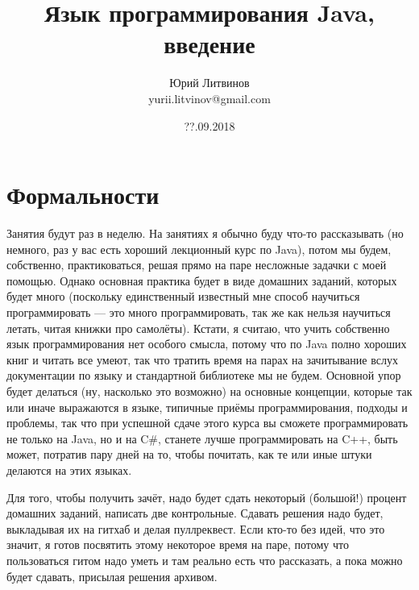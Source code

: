 \documentclass[a5paper]{article}
\title{Язык программирования Java, введение}
\author{Юрий Литвинов\\\small{yurii.litvinov@gmail.com}}
\date{??.09.2018}
\begin{document}
\maketitle
\thispagestyle{empty}

\section{Формальности}

Занятия будут раз в неделю. На занятиях я обычно буду что-то рассказывать (но немного, раз у вас есть хороший лекционный курс по Java), потом мы будем, собственно, практиковаться, решая прямо на паре несложные задачки с моей помощью. Однако основная практика будет в виде домашних заданий, которых будет много (поскольку единственный известный мне способ научиться программировать --- это много программировать, так же как нельзя научиться летать, читая книжки про самолёты). Кстати, я считаю, что учить собственно язык программирования нет особого смысла, потому что по Java полно хороших книг и читать все умеют, так что тратить время на парах на зачитывание вслух документации по языку и стандартной библиотеке мы не будем. Основной упор будет делаться (ну, насколько это возможно) на основные концепции, которые так или иначе выражаются в языке, типичные приёмы программирования, подходы и проблемы, так что при успешной сдаче этого курса вы сможете программировать не только на Java, но и на C\#, станете лучше программировать на C++, быть может, потратив пару дней на то, чтобы почитать, как те или иные штуки делаются на этих языках.

Для того, чтобы получить зачёт, надо будет сдать некоторый (большой!) процент домашних заданий, написать две контрольные. Сдавать решения надо будет, выкладывая их на гитхаб и делая пуллреквест. Если кто-то без идей, что это значит, я готов посвятить этому некоторое время на паре, потому что пользоваться гитом надо уметь и там реально есть что рассказать, а пока можно будет сдавать, присылая решения архивом. 
\end{document}
